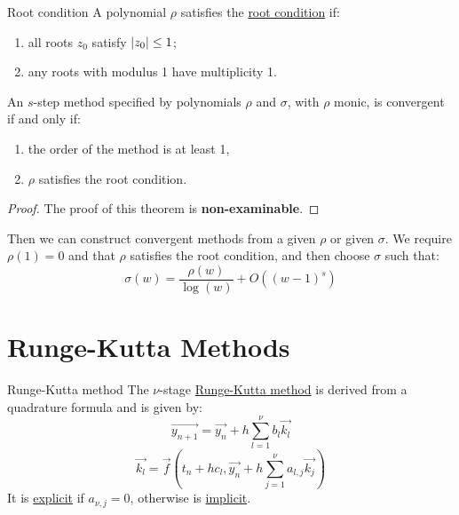\documentclass[../Main.tex]{subfiles}
\begin{document}
\begin{definition}{Root condition}
    A polynomial $\rho$ satisfies the \underline{root condition} if:
    \begin{enumerate}
        \item all roots $z_0$ satisfy $\left|z_0\right| \leq 1$;
        \item any roots with modulus 1 have multiplicity 1.
    \end{enumerate}
\end{definition}
\begin{theorem}
    An $s$-step method specified by polynomials $\rho$ and $\sigma$, with $\rho$ monic, is convergent if and only if:
    \begin{enumerate}
        \item the order of the method is at least 1,
        \item $\rho$ satisfies the root condition.
    \end{enumerate}
    \label{thmDahlquistEquiv}
\end{theorem}
\begin{proof}
    The proof of this theorem is \textbf{non-examinable}.
\end{proof}
Then we can construct convergent methods from a given $\rho$ or given $\sigma$. We require $\rho(1) = 0$ and that $\rho$ satisfies the root condition, and then choose $\sigma$ such that:
\begin{equation*}
    \sigma(w) = \frac{\rho(w)}{\log(w)} + O((w - 1)^s)
\end{equation*}
\section{Runge-Kutta Methods}
\begin{definition}{Runge-Kutta method}
    The $\nu$-stage \underline{Runge-Kutta method} is derived from a quadrature formula and is given by:
    \begin{equation*}
        \vec{y_{n+1}} = \vec{y_{n}} + h \sum_{l=1}^{\nu} b_l \vec{k_l}
    \end{equation*}
    \begin{equation*}
        \vec{k_l} = \vec{f}(t_n + hc_l,\vec{y_n} + h \sum_{j=1}^{\nu} a_{l, j} \vec{k_j})
    \end{equation*}
    It is \underline{explicit} if $a_{\nu, j} = 0$, otherwise is \underline{implicit}.
\end{definition}
\end{document}
